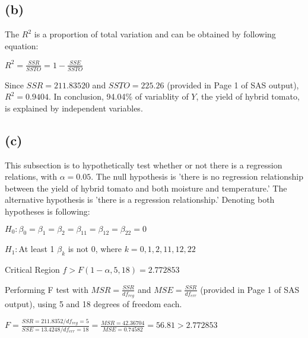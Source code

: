 \documentclass[letterpaper]{article}
\begin{document}
\subsection{(b)}
\begin{flushleft}
The $R^2$ is a proportion of total variation and can be obtained by following equation:
\end{flushleft}

\begin{center}
$R^2 = \frac{SSR}{SSTO} = 1 - \frac{SSE}{SSTO}$
\end{center}

\begin{flushleft}
Since $SSR = 211.83520$ and $SSTO = 225.26$ (provided in Page 1 of SAS output), $R^2 = 0.9404$. In conclusion, 94.04\% of variablity of $Y$, the yield of hybrid tomato, is explained by independent variables.
\end{flushleft}

\subsection{(c)}
\begin{flushleft}
This subsection is to hypothetically test whether or not there is a regression relations, with $\alpha=0.05$. The null hypothesis is 'there is no regression relationship between the yield of hybrid tomato and both moisture and temperature.' The alternative hypothesis is 'there is a regression relationship.' Denoting both hypotheses is following:
\end{flushleft}

\begin{center}
$H_0: \beta_0=\beta_1=\beta_2=\beta_{11}=\beta_{12}=\beta_{22}=0$

$H_1: $At least 1 $\beta_k$ is not 0, where $k = 0, 1, 2, 11, 12, 22$

Critical Region $f > F(1 - \alpha, 5, 18) = 2.772853$
\end{center}

\begin{flushleft}
Performing F test with $MSR=\frac{SSR}{df_{reg}}$ and $MSE=\frac{SSR}{df_{err}}$ (provided in Page 1 of SAS output), using 5 and 18 degrees of freedom each.
\end{flushleft}

\begin{center}
$F = \frac{SSR=211.8352/df_{reg}=5}{SSE=13.4248/df_{err}=18} = \frac{MSR=42.36704}{MSE=0.74582} = 56.81 > 2.772853$
\end{center}
\end{document}
